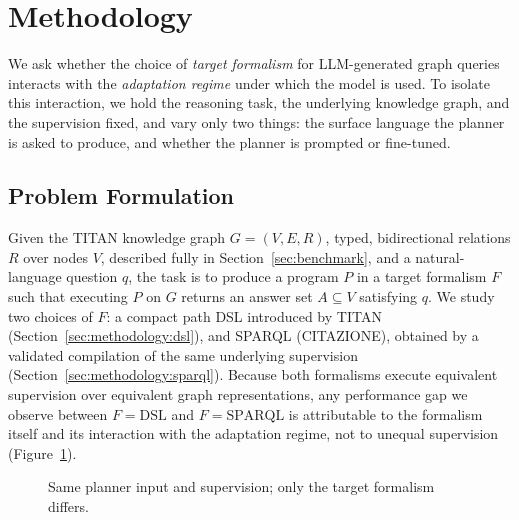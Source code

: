 \section{Methodology}
\label{sec:methodology}

We ask whether the choice of \emph{target formalism} for LLM-generated graph queries interacts with the \emph{adaptation regime} under which the model is used. To isolate this interaction, we hold the reasoning task, the underlying knowledge graph, and the supervision fixed, and vary only two things: the surface language the planner is asked to produce, and whether the planner is prompted or fine-tuned.

\subsection{Problem Formulation}
\label{sec:methodology:formulation}

Given the TITAN knowledge graph $G=(V,E,R)$, typed, bidirectional relations $R$ over nodes $V$, described fully in Section~\ref{sec:benchmark}, and a natural-language question $q$, the task is to produce a program $P$ in a target formalism $F$ such that executing $P$ on $G$ returns an answer set $A \subseteq V$ satisfying $q$. We study two choices of $F$: a compact path DSL introduced by TITAN (Section~\ref{sec:methodology:dsl}), and SPARQL (CITAZIONE), obtained by a validated compilation of the same underlying supervision (Section~\ref{sec:methodology:sparql}). Because both formalisms execute equivalent supervision over equivalent graph representations, any performance gap we observe between $F{=}\text{DSL}$ and $F{=}\text{SPARQL}$ is attributable to the formalism itself and its interaction with the adaptation regime, not to unequal supervision (Figure~\ref{fig:pipeline}).

\begin{figure}[t]
\centering
{}
\caption{Same planner input and supervision; only the target formalism differs.}
\label{fig:pipeline}
\end{figure}

